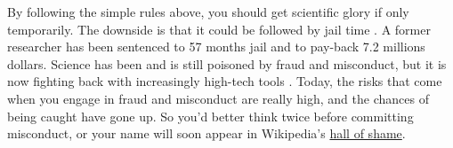 \documentclass[a4paper,10pt,onecolumn]{article}
\begin{document}
By following the simple rules above, you should get scientific glory if only temporarily. The downside is that it could be followed by jail time \citep{grant:2015}. A former researcher has been sentenced to
57 months jail and to pay-back 7.2 millions dollars. Science has been and is
still poisoned by fraud and misconduct, but it is now fighting back with increasingly high-tech tools \citep{buranyi:2017}. Today, the risks that come when you engage in
fraud and misconduct are really high, and the chances of being
caught have gone up. So you'd better think twice before committing misconduct, or
your name will soon appear in Wikipedia's
\href{https://en.wikipedia.org/wiki/Scientific_misconduct#Notable_individual_cases}{hall of shame}.


\renewcommand*{\bibfont}{\small}
\printbibliography[title=References]
\end{document}

